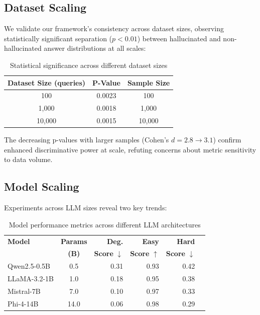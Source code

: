 \documentclass[sigconf]{acmart}
\begin{document}
\subsection{Dataset Scaling}
We validate our framework's consistency across dataset sizes, observing statistically significant separation ($p < 0.01$) between hallucinated and non-hallucinated answer distributions at all scales:

\begin{table}[h]
\centering
\begin{tabular}{ccc}
\hline
\textbf{Dataset Size (queries)} & \textbf{P-Value} & \textbf{Sample Size} \\
\hline
100 & 0.0023 & 100 \\
1,000 & 0.0018 & 1,000 \\
10,000 & 0.0015 & 10,000 \\
\hline
\end{tabular}
\caption{Statistical significance across different dataset sizes}
\end{table}



The decreasing p-values with larger samples (Cohen's $d = 2.8 \rightarrow 3.1$) confirm enhanced discriminative power at scale, refuting concerns about metric sensitivity to data volume.

\subsection{Model Scaling}
Experiments across LLM sizes reveal two key trends:

\begin{table}[h]
\centering
\small
\setlength{\tabcolsep}{3pt}
\renewcommand{\arraystretch}{1.1}
\begin{tabular}{@{}lcrrrr@{}}
\hline
\textbf{Model} & \textbf{Params} & \textbf{Deg.} & \textbf{Easy} & \textbf{Hard} \\
 & \textbf{(B)} & \textbf{Score} $\downarrow$ & \textbf{Score} $\uparrow$ & \textbf{Score} $\downarrow$ \\
\hline
Qwen2.5-0.5B \cite{Qwen2.5} & 0.5 & 0.31 & 0.93 & 0.42 \\
LLaMA-3.2-1B \cite{llama_3.2} & 1.0 & 0.18 & 0.95 & 0.38 \\
Mistral-7B \cite{mistral_7b} & 7.0 & 0.10 & 0.97 & 0.33 \\
Phi-4-14B \cite{phi_4} & 14.0 & 0.06 & 0.98 & 0.29 \\
\hline
\end{tabular}
\caption{Model performance metrics across different LLM architectures}
\end{table}
\end{document}
